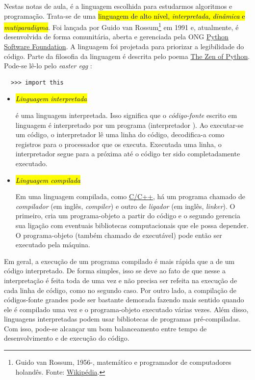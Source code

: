Nestas notas de aula, \hl{{\python}} é a linguagem escolhida para estudarmos algoritmos e programação. Trata-se de uma \hl{linguagem de alto nível, \emph{interpretada}, \emph{dinâmica} e \emph{mutiparadigma}}. Foi lançada por Guido van Rossum\footnote{Guido van Rossum, 1956-, matemático e programador de computadores holandês. Fonte: \href{https://pt.wikipedia.org/wiki/Guido\_van\_Rossum}{Wikipédia}.} em 1991 e, atualmente, é desenvolvida de forma comunitária, aberta e gerenciada pela ONG \href{https://pt.wikipedia.org/wiki/Python_Software_Foundation}{Python Software Foundation}. A linguagem foi projetada para priorizar a legibilidade do código. Parte da filosofia da linguagem é descrita pelo poema \href{https://pt.wikipedia.org/wiki/Zen_de_Python}{The Zen of Python}. Pode-se lê-lo pelo {\it easter egg} {\python}:
\begin{lstlisting}
  >>> import this
\end{lstlisting}

\begin{itemize}
\item \hl{\emph{Linguagem interpretada}}

  {\python} é uma linguagem interpretada. Isso significa que o \emph{código-fonte} escrito em linguagem {\python} é interpretado por um programa (interpretador {\python}). Ao executar-se um código, o interpretador lê uma linha do código, decodifica-a como registros para o processador que os executa. Executada uma linha, o interpretador segue para a próxima até o código ter sido completadamente executado.

\item \hl{\emph{Linguagem compilada}}

  Em uma linguagem compilada, como \href{https://pt.wikipedia.org/wiki/C\%2B\%2B}{C/C++}, há um programa chamado de \emph{compilador} (em inglês, {\it compiler}) e outro de \emph{ligador} (em inglês, {\it linker}). O primeiro, cria um programa-objeto a partir do código e o segundo gerencia sua ligação com eventuais bibliotecas computacionais que ele possa depender. O programa-objeto (também chamado de executável) pode então ser executado pela máquina.
\end{itemize}

Em geral, a execução de um programa compilado é mais rápida que a de um código interpretado. De forma simples, isso se deve ao fato de que nesse a interpretação é feita toda de uma vez e não precisa ser refeita na execução de cada linha de código, como no segundo caso. Por outro lado, a compilação de códigos-fonte grandes pode ser bastante demorada fazendo mais sentido quando ele é compilado uma vez e o programa-objeto executado várias vezes. Além disso, linguagens interpretadas podem usar bibliotecas de programas pré-compiladas. Com isso, pode-se alcançar um bom balanceamento entre tempo de desenvolvimento e de execução do código.

